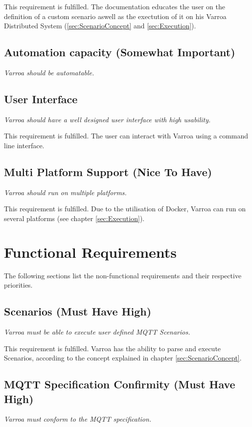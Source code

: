 This requirement is fulfilled.
The documentation educates the user on the definition of a custom scenario aswell as the exectution of it on his Varroa Distributed System (\ref{sec:ScenarioConcept} and \ref{sec:Execution}).

\subsection{Automation capacity (Somewhat Important)} 
\emph{Varroa should be automatable.}


\subsection{User Interface}
\emph{Varroa should have a well designed user interface with high usability.}

This requirement is fulfilled.
The user can interact with Varroa using a command line interface.

\subsection{Multi Platform Support (Nice To Have)}
\emph{Varroa should run on multiple platforms.}

This requirement is fulfilled.
Due to the utilisation of Docker, Varroa can run on several platforms (see chapter \ref{sec:Execution}).

\section{Functional Requirements}
The following sections list the non-functional requirements and their respective priorities.

\subsection{Scenarios (Must Have High)}
\emph{Varroa must be able to execute user defined MQTT Scenarios.}

This requirement is fulfilled.
Varroa has the ability to parse and execute Scenarios, according to the concept explained in chapter \ref{sec:ScenarioConcept}.

\subsection{MQTT Specification Confirmity (Must Have High)}
\emph{Varroa must conform to the MQTT specification.}

